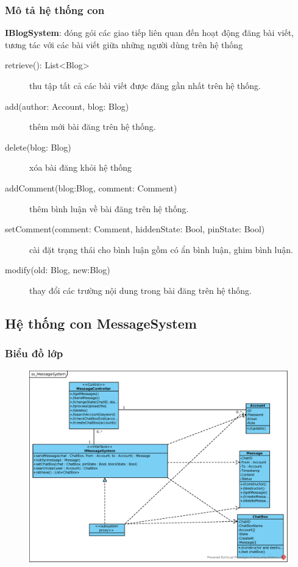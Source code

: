 \documentclass[./../main_file.tex]{subfiles}
\begin{document}
		\subsubsection{Mô tả hệ thống con}
		\textbf{IBlogSystem}: đóng gói các giao tiếp liên quan đến hoạt động đăng bài viết, tương tác với các bài viết giữa những người dùng trên hệ thống
		\begin{description}
			\item[retrieve(): List<Blog>] thu tập tất cả các bài viết được đăng gần nhất trên hệ thống.
			\item[add(author: Account, blog: Blog)] thêm mới bài đăng trên hệ thống.
			\item[delete(blog: Blog)] xóa bài đăng khỏi hệ thống
			\item[addComment(blog:Blog, comment: Comment)] thêm bình luận về bài đăng trên hệ thống.
			\item[setComment(comment: Comment, hiddenState: Bool, pinState: Bool)] cài đặt trạng thái cho bình luận gồm có ẩn bình luận, ghim bình luận.
			\item[modify(old: Blog, new:Blog)] thay đổi các trường nội dung trong bài đăng trên hệ thống.
		\end{description}
		
	\subsection{Hệ thống con MessageSystem}
		\subsubsection{Biểu đồ lớp}
		\begin{figure}[H]
			\centering
			\includegraphics[width=\linewidth]{./images/ss_MessageSystem.eps}
		\end{figure}
\end{document}
